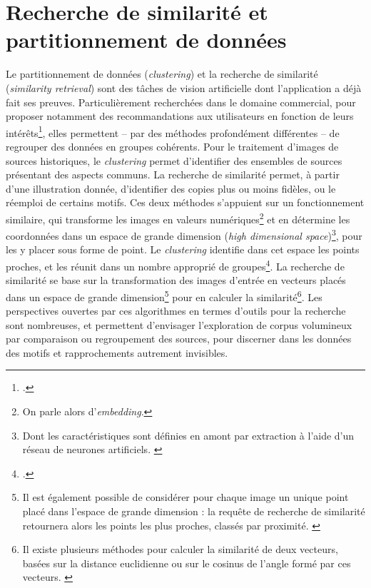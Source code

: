 \documentclass[a4paper,12pt,twoside]{book}
\begin{document}
        \chapter[\textit{Similarity retrieval} et \textit{clustering}]{Recherche de similarité et partitionnement de données}
        Le partitionnement de données (\textit{clustering}) et la recherche de similarité (\textit{similarity retrieval}) sont des tâches de vision artificielle dont l'application a déjà fait ses preuves. Particulièrement recherchées dans le domaine commercial, pour proposer notamment des recommandations aux utilisateurs en fonction de leurs intérêts\footcite{gronneIntroductionEmbeddingClustering2022}, elles permettent -- par des méthodes profondément différentes -- de regrouper des données en groupes cohérents. Pour le traitement d'images de sources historiques, le \textit{clustering} permet d'identifier des ensembles de sources présentant des aspects communs. La recherche de similarité permet, à partir d'une illustration donnée, d'identifier des copies plus ou moins fidèles, ou le réemploi de certains motifs. Ces deux méthodes s'appuient sur un fonctionnement similaire, qui transforme les images en valeurs numériques\footnote{On parle alors d'\textit{embedding}.} et en détermine les coordonnées dans un espace de grande dimension (\textit{high dimensional space})\footnote{Dont les caractéristiques sont définies en amont par extraction à l'aide d'un réseau de neurones artificiels. \cite{moiraghiExplorerCorpusImages2018}}, pour les y placer sous forme de point. Le \textit{clustering} identifie dans cet espace les points proches, et les réunit dans un nombre approprié de groupes\footcite{gronneIntroductionEmbeddingClustering2022}. La recherche de similarité se base sur la transformation des images d'entrée en vecteurs placés dans un espace de grande dimension\footnote{ Il est également possible de considérer pour chaque image un unique point placé dans l'espace de grande dimension : la requête de recherche de similarité retournera alors les points les plus proches, classés par proximité. \cite{dilenardoVisualPatternsDiscovery}} pour en calculer la similarité\footnote{Il existe plusieurs méthodes pour calculer la similarité de deux vecteurs, basées sur la distance euclidienne ou sur le cosinus de l'angle formé par ces vecteurs. \cite{gronneIntroductionEmbeddingClustering2022}}. Les perspectives ouvertes par ces algorithmes en termes d'outils pour la recherche sont nombreuses, et permettent d'envisager l'exploration de corpus volumineux par comparaison ou regroupement des sources, pour discerner dans les données des motifs et rapprochements autrement invisibles.
        
\end{document}
